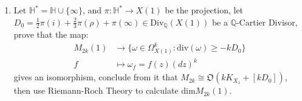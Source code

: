 \begin{enumerate}[1]
\begin{proofc}[解答]
\begin{itemize}
        
        \item Secondly, we check it is of genus $1$.
        \begin{center}
        \end{center}
        Because $\mathbb{C}/L \cong P/\{b\omega_2 \sim \omega_1 + b\omega_2, a\omega_1 \sim a\omega_1 + \omega_2\}$, we know $\mathbb{C}/L$ is homeomorphic to $T^2$, 

        By the triangulation of $T^2$ above, we have $2-2g(T^2) = V+F-E = 9+18-27 = 0 \Rightarrow g(T^2) = 1$.



        \end{itemize}
    
    
    \end{proofc}
    

    \item Let $\mathbb{H}^{*} = \mathbb{H} \cup \{\infty \}$, and $\pi: \mathbb{H}^* \to X(1)$ be the projection, let $D_0 = \frac12 \pi(i) + \frac23 \pi(\rho) + \pi(\infty) \in \mathrm{Div}_{\mathbb{Q}}(X(1))$ be a $\mathbb{Q}$-Cartier Divisor, prove that the map:
    \begin{align}
        M_{2k}(1) &\to \{\omega \in \Omega_{X(1)}^k: \mathrm{div}(\omega) \geq -kD_0\} \\
        f &\mapsto \omega_f = f(z)(dz)^k

    \end{align}
    gives an isomorphism, conclude from it that $M_{2k} \cong \mathfrak{O}(kK_{X_1} + [kD_0])$, then use Riemann-Roch Theory to calculate $\mathrm{dim} M_{2k}(1)$.
    

\end{enumerate}
